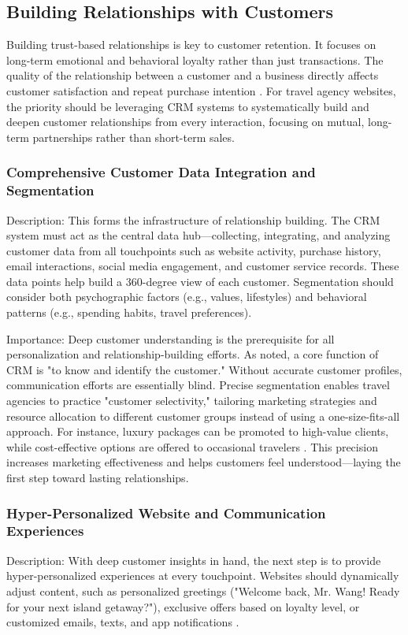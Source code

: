 \subsection{Building Relationships with Customers}
Building trust-based relationships is key to customer retention. It focuses on long-term emotional and behavioral loyalty rather than just transactions. The quality of the relationship between a customer and a business directly affects customer satisfaction and repeat purchase intention \cite{barusman2019antecedent}. For travel agency websites, the priority should be leveraging CRM systems to systematically build and deepen customer relationships from every interaction, focusing on mutual, long-term partnerships rather than short-term sales.

\subsubsection{Comprehensive Customer Data Integration and Segmentation}
Description: This forms the infrastructure of relationship building. The CRM system must act as the central data hub—collecting, integrating, and analyzing customer data from all touchpoints such as website activity, purchase history, email interactions, social media engagement, and customer service records. These data points help build a 360-degree view of each customer. Segmentation should consider both psychographic factors (e.g., values, lifestyles) and behavioral patterns (e.g., spending habits, travel preferences).

Importance: Deep customer understanding is the prerequisite for all personalization and relationship-building efforts. As \cite{singh2017customer} noted, a core function of CRM is "to know and identify the customer." Without accurate customer profiles, communication efforts are essentially blind. Precise segmentation enables travel agencies to practice "customer selectivity," tailoring marketing strategies and resource allocation to different customer groups instead of using a one-size-fits-all approach. For instance, luxury packages can be promoted to high-value clients, while cost-effective options are offered to occasional travelers \cite{liao2023customer}. This precision increases marketing effectiveness and helps customers feel understood—laying the first step toward lasting relationships.

\subsubsection{Hyper-Personalized Website and Communication Experiences}
Description: With deep customer insights in hand, the next step is to provide hyper-personalized experiences at every touchpoint. Websites should dynamically adjust content, such as personalized greetings ("Welcome back, Mr. Wang! Ready for your next island getaway?"), exclusive offers based on loyalty level, or customized emails, texts, and app notifications \cite{casaca2024influence}.

